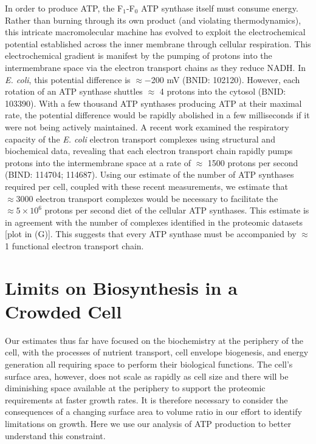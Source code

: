 In order to produce ATP, the F$_1$-F$_0$ ATP synthase itself must consume
energy. Rather than burning through its own product (and violating
thermodynamics), this intricate macromolecular machine has evolved to exploit
the electrochemical potential established across the inner membrane through
cellular respiration. This electrochemical gradient is manifest by the pumping
of protons into the intermembrane space via the electron transport chains as
they reduce NADH. In \textit{E. coli}, this potential difference is $\approx
-$200 mV (BNID: 102120). However, each rotation of an ATP synthase shuttles
$\approx$ 4 protons into the cytosol (BNID: 103390). With a few thousand ATP
synthases producing ATP at their maximal rate, the potential difference would be
rapidly abolished in a few milliseconds if it were not being actively
maintained. A recent work \citep{szenk2017} examined the respiratory capacity of
the \textit{E. coli} electron transport complexes using structural and
biochemical data, revealing that each electron transport chain rapidly pumps
protons into the intermembrane space at a rate of $\approx$ 1500 protons per
second (BIND: 114704; 114687). Using our estimate of the number of ATP synthases
required per cell, coupled with these recent measurements, we estimate that
$\approx 3000$ electron transport complexes would be necessary to facilitate the
$\approx 5 \times 10^6$ protons per second diet of the cellular ATP synthases.
This estimate is in agreement with the number of complexes identified in the
proteomic datasets [plot in (G)]. This suggests
that every ATP synthase must be accompanied by $\approx$ 1 functional electron
transport chain.

\section{Limits on Biosynthesis in a Crowded Cell}
Our estimates thus far have focused on the biochemistry at the periphery of the
cell, with the processes of nutrient transport, cell envelope biogenesis, and
energy generation all requiring space to perform their biological functions. The
cell's surface area, however, does not scale as rapidly as cell size
\citep{harris2018} and there will be diminishing space available at the
periphery to support the proteomic requirements at faster growth rates. It is
therefore necessary to consider the consequences of a changing surface area to
volume ratio in our effort to identify limitations on growth. Here we use our
analysis of ATP production to better understand this constraint.

